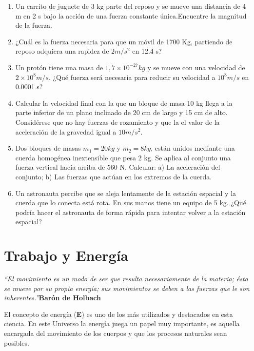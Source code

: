 \documentclass[a5paper,pagesize,10pt,bibtotoc,pointlessnumbers,
normalheadings,DIV=9,fleqn,x11names,table,twoside=false]{scrbook}
\begin{document}
\begin{enumerate}
\item Un carrito de juguete de 3 kg parte del reposo y se mueve una distancia de 4 m en 2 s bajo la acción de una fuerza constante 
única.Encuentre la magnitud de la fuerza. 

\item ¿Cuál es la fuerza necesaria para que un móvil de 1700 Kg, partiendo de reposo adquiera una rapidez de $2 m/s^2$ en 12.4 s?

\item Un protón tiene una masa de $1,7 \times 10^{−27} kg$ y se mueve con una velocidad de $2 \times 10^8 m/s$. ¿Qué fuerza será 
necesaria para reducir su velocidad a $10^8 m/s$ en 0.0001 s?

\item Calcular la velocidad final con la que un bloque de masa 10 kg llega a la parte inferior de un plano inclinado de 20 cm 
de largo y 15 cm de alto. Considérese que no hay fuerzas de rozamiento y que la el valor de la aceleración de la gravedad
igual a $10 m/s^2$.

\item Dos bloques de masas $m_1 = 20 kg$ y $m_2 = 8 kg$, están unidos mediante una cuerda homogénea inextensible que pesa 2 kg. Se
aplica al conjunto una fuerza vertical hacia arriba de 560 N. Calcular: a) La aceleración del conjunto; b) Las fuerzas que actúan 
en los extremos de la cuerda.

\item Un astronauta percibe que se aleja lentamente de la estación espacial y la cuerda que lo conecta está rota. En sus manos 
tiene un equipo de 5 kg. ¿Qué podría hacer el astronauta de forma rápida para intentar volver a la estación espacial?     

\end{enumerate}



\chapter{Trabajo y Energía}

\textit{``El movimiento es un modo de ser que resulta necesariamente de la materia; ésta se mueve por su propia energía; sus 
movimientos se deben a las fuerzas que le son inherentes.''}\textbf{Barón de Holbach}\vspace{1.0 cm}

El concepto de energía (\textbf{E}) es uno de los más utilizados y destacados en esta ciencia. En este Universo la energía juega 
un papel muy importante, es aquella encargada del movimiento de los cuerpos y que los procesos naturales sean posibles.
\end{document}

